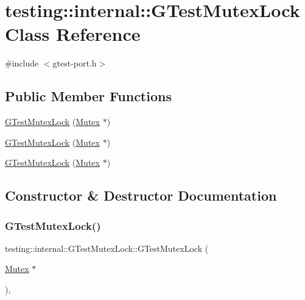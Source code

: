 \hypertarget{classtesting_1_1internal_1_1_g_test_mutex_lock}{}\section{testing\+::internal\+::G\+Test\+Mutex\+Lock Class Reference}
\label{classtesting_1_1internal_1_1_g_test_mutex_lock}


{\ttfamily \#include $<$gtest-\/port.\+h$>$}

\subsection*{Public Member Functions}
\begin{DoxyCompactItemize}
\item 
\mbox{\hyperlink{classtesting_1_1internal_1_1_g_test_mutex_lock_a77e3cba326d5356b4a1dea3790559c26}{G\+Test\+Mutex\+Lock}} (\mbox{\hyperlink{classtesting_1_1internal_1_1_mutex}{Mutex}} $\ast$)
\item 
\mbox{\hyperlink{classtesting_1_1internal_1_1_g_test_mutex_lock_a77e3cba326d5356b4a1dea3790559c26}{G\+Test\+Mutex\+Lock}} (\mbox{\hyperlink{classtesting_1_1internal_1_1_mutex}{Mutex}} $\ast$)
\item 
\mbox{\hyperlink{classtesting_1_1internal_1_1_g_test_mutex_lock_a77e3cba326d5356b4a1dea3790559c26}{G\+Test\+Mutex\+Lock}} (\mbox{\hyperlink{classtesting_1_1internal_1_1_mutex}{Mutex}} $\ast$)
\end{DoxyCompactItemize}


\subsection{Constructor \& Destructor Documentation}
\mbox{\label{classtesting_1_1internal_1_1_g_test_mutex_lock_a77e3cba326d5356b4a1dea3790559c26}} 
\subsubsection{\texorpdfstring{GTestMutexLock()}{GTestMutexLock()}\hspace{0.1cm}{\footnotesize\ttfamily [1/3]}}
{\footnotesize\ttfamily testing\+::internal\+::\+G\+Test\+Mutex\+Lock\+::\+G\+Test\+Mutex\+Lock (\begin{DoxyParamCaption}\item[{\mbox{\hyperlink{classtesting_1_1internal_1_1_mutex}{Mutex}} $\ast$}]{ }\end{DoxyParamCaption})\hspace{0.3cm}{\ttfamily [inline]}, {\ttfamily [explicit]}}

